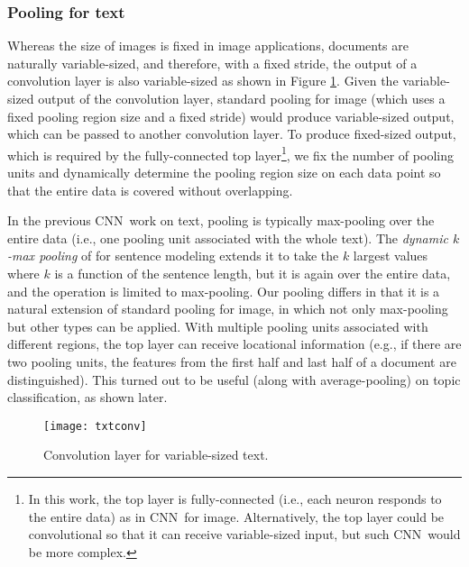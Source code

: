 \documentclass[11pt,letterpaper]{article}
\newcommand{\cnn}{CNN}
\begin{document}
\subsubsection{Pooling for text}
Whereas the size of images is fixed in image applications, 
documents are naturally variable-sized, 
and therefore, with a fixed stride, the output of a convolution layer is also variable-sized 
as shown in Figure \ref{fig:txtconv}.  
Given the variable-sized output of the convolution layer, 
standard pooling for image (which uses a fixed pooling region size and a fixed stride) 
would produce variable-sized output, 
which can be passed to another convolution layer.   
To produce fixed-sized output, 
which is required by the fully-connected top layer\footnote{
  In this work, the top layer is fully-connected (i.e., each neuron responds to the entire data) 
  as in \cnn\ for image.  
  Alternatively, the top layer could be convolutional so that it can receive variable-sized input, 
  but such \cnn\ would be more complex.   
}, 
we fix the number of pooling units and dynamically
determine the pooling region size on each data point
so that the entire data is covered without overlapping.  


In the previous \cnn\ work on text, pooling is typically max-pooling 
over the entire data (i.e., one pooling unit associated with the whole text).  
The {\em dynamic $k$-max pooling} of \cite{KGB14} for sentence modeling extends it 
to take the $k$ largest values where $k$ is a function of the sentence length, 
but it is again over the entire data, and the operation is limited to max-pooling.  
Our pooling differs in that it is a natural extension of standard pooling for image, 
in which not only max-pooling but other types can be applied.  
With multiple pooling units associated with 
different regions, the top layer can receive locational 
information (e.g., if there are two pooling units, 
the features from the first half and last half of a document are distinguished).  
This turned out to be useful (along with average-pooling) 
on topic classification, as shown later.  



\begin{figure}
\centering
\texttt{[image: txtconv]}
\vspace{-0.15in}
\caption{\label{fig:txtconv} \footnotesize Convolution layer for variable-sized text.  
}
\end{figure}
\end{document}
